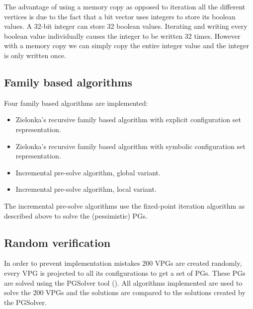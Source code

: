 The advantage of using a memory copy as opposed to iteration all the different vertices is due to the fact that a bit vector uses integers to store its boolean values. A 32-bit integer can store 32 boolean values. Iterating and writing every boolean value individually causes the integer to be written 32 times. However with a memory copy we can simply copy the entire integer value and the integer is only written once.
\subsection{Family based algorithms}
Four family based algorithms are implemented:
\begin{itemize}
	\item Zielonka's recursive family based algorithm with explicit configuration set representation.
	\item Zielonka's recursive family based algorithm with symbolic configuration set representation.
	\item Incremental pre-solve algorithm, global variant.
	\item Incremental pre-solve algorithm, local variant.
\end{itemize}
The incremental pre-solve algorithms use the fixed-point iteration algorithm as described above to solve the (pessimistic) PGs.
\subsection{Random verification}
In order to prevent implementation mistakes 200 VPGs are created randomly, every VPG is projected to all its configurations to get a set of PGs. These PGs are solved using the PGSolver tool (\cite{Friedmann2010ThePC}). All algorithms implemented are used to solve the 200 VPGs and the solutions are compared to the solutions created by the PGSolver.